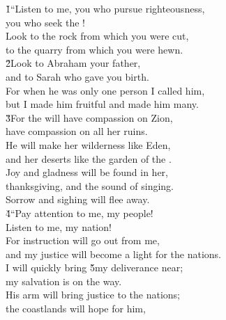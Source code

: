 \begin{poetry}
\poeml {}
\v{1}``Listen to me, you who pursue righteousness, \\
\poemll    you who seek the ! \\
\poeml Look to the rock from which you were cut, \\
\poemll    to the quarry from which you were hewn. \\
\poeml \v{2}Look to Abraham your father, \\
\poemll    and to Sarah who gave you birth. \\
\poeml For when he was only one person I called him, \\
\poemll    but I made him fruitful and made him many. \\
\poeml \v{3}For the  will have compassion on Zion, \\
\poemll    have compassion on all her ruins. \\
\poeml He will make her wilderness like Eden, \\
\poemll    and her deserts like the garden of the . \\
\poeml Joy and gladness will be found in her, \\
\poemll    thanksgiving, and the sound of singing. \\
\poemlll       Sorrow and sighing will flee away. \\
\poeml \v{4}``Pay attention to me, my people! \\
\poemll    Listen to me, my nation! \\
\poeml For instruction will go out from me, \\
\poemll    and my justice will become a light for the nations. \\
\poeml I will quickly bring \v{5}my deliverance near; \\
\poemll    my salvation is on the way. \\
\poeml His arm will bring justice to the nations; \\
\poemll    the coastlands will hope for him, \\

\end{poetry}
